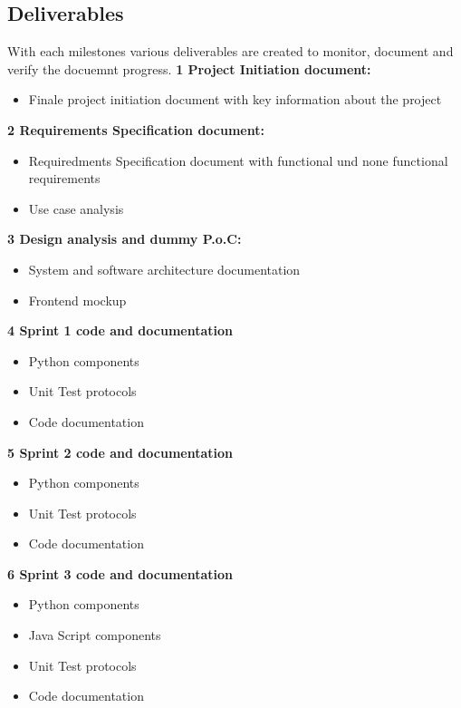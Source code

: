 \documentclass[notitlepage]{article}
\begin{document}
\begin{flushleft}
 

\subsection{Deliverables}
With each milestones various deliverables are created to monitor, document and verify the docuemnt progress.
\newline
\textbf{1 Project Initiation document:}
\\
\begin{itemize}
	\item Finale project initiation document with key information about the project
\end{itemize}

\textbf{2 Requirements Specification document:}
\\
\begin{itemize}
	\item Requiredments Specification document with functional und none functional requirements
	\item Use case analysis
\end{itemize}

\textbf{3 Design analysis and dummy P.o.C:}
\\
\begin{itemize}
	\item System and software architecture documentation
	\item Frontend mockup
\end{itemize}

\textbf{4 Sprint 1 code and documentation }
\\
\begin{itemize}
	\item Python components
	\item Unit Test protocols
	\item Code documentation
\end{itemize}

\textbf{5  Sprint 2 code and documentation }
\\
\begin{itemize}
	\item Python components
	\item Unit Test protocols
	\item Code documentation
\end{itemize}

\textbf{6 Sprint 3 code and documentation }
\\
\begin{itemize}
	\item Python components
	\item Java Script components
	\item Unit Test protocols
	\item Code documentation
\end{itemize}


\end{flushleft}
\end{document}

